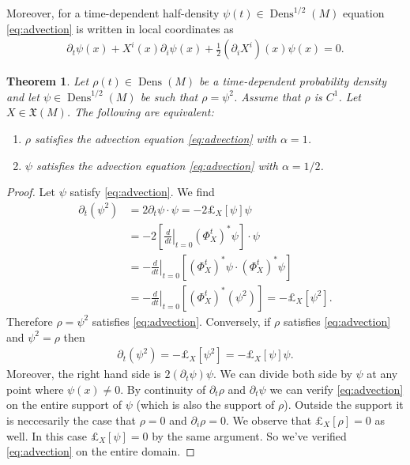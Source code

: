 \documentclass[letterpaper, 12 pt]{amsart}
\newtheorem{thm}{Theorem}[section]
\DeclareMathOperator{\Dens}{Dens}
\begin{document}
  Moreover, for a time-dependent half-density $\psi(t) \in \Dens^{1/2}(M)$
  equation \eqref{eq:advection} is written in local coordinates as
  \begin{align*}
    \partial_t \psi(x) 
    + X^i(x) \partial_i \psi(x) 
    + \frac{1}{2} (\partial_i X^i)(x) \psi(x) = 0.
  \end{align*}
  \begin{thm} \label{thm:advection}
    Let $\rho(t) \in \Dens(M)$ be a time-dependent probability density
    and let $\psi \in \Dens^{1/2}(M)$ be such that $\rho = \psi^2$.
    Assume that $\rho$ is $C^1$.
    Let $X \in \mathfrak{X}(M)$.
    The following are equivalent:
    \begin{enumerate}
      \item $\rho$ satisfies the advection equation \eqref{eq:advection} with $\alpha = 1$.
      \item $\psi$ satisfies the advection equation \eqref{eq:advection} with $\alpha = 1/2$.
    \end{enumerate}
  \end{thm}
  \begin{proof}
    Let $\psi$ satisfy \eqref{eq:advection}.
    We find
    \begin{align*}
      \partial_t (\psi^2) &= 2 \partial_t\psi \cdot \psi
      =-2 \pounds_X[\psi] \psi \\
      &= - 2 \left[ \left.\frac{d}{dt}\right|_{t=0}
         (\Phi_X^t)^* \psi \right] \cdot \psi \\
      &= - \left. \frac{d}{dt} \right|_{t=0}
        \left[ (\Phi_X^t)^* \psi \cdot (\Phi_X^t)^* \psi \right]\\
      &= - \left. \frac{d}{dt} \right|_{t=0}
        \left[ (\Phi_X^t)^* (\psi^2) \right] 
      = - \pounds_X[\psi^2].
    \end{align*}
    Therefore $\rho = \psi^2$ satisfies \eqref{eq:advection}.
    Conversely, if $\rho$ satisfies \eqref{eq:advection}
    and $\psi^2 = \rho$ then
    \begin{align*}
      \partial_t (\psi^2) = - \pounds_X[\psi^2] = - \pounds_X[\psi] \psi.
    \end{align*}
    Moreover, the right hand side is $2 (\partial_t \psi) \psi$.
    We can divide both side by $\psi$ at any point where $\psi(x) \neq 0$.
    By continuity of $\partial_t \rho$ and $\partial_t \psi$ we can
    verify \eqref{eq:advection} on the entire support of $\psi$
    (which is also the support of $\rho$).
    Outside the support it is neccesarily the case that
    $\rho = 0$ and  $\partial_i \rho = 0$.
    We observe that $\pounds_X[\rho] = 0$ as well.
    In this case $\pounds_X[\psi] = 0$ by the same argument.
    So we've verified \eqref{eq:advection} on the entire domain.
  \end{proof}
\end{document}
